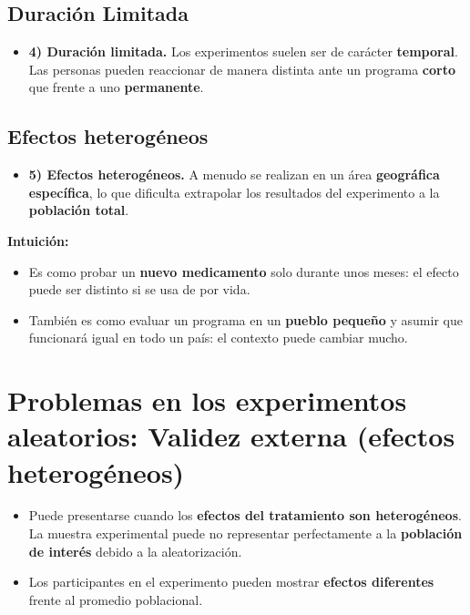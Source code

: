 \documentclass[12pt]{article}
\begin{document}
\subsection*{\noindent\textbf{Duración Limitada}}

\begin{itemize}
    \item \textbf{4) Duración limitada.}  
    Los experimentos suelen ser de carácter \textbf{temporal}. Las personas pueden reaccionar de manera distinta ante un programa \textbf{corto} que frente a uno \textbf{permanente}.
    \end{itemize}

\subsection*{\noindent\textbf{Efectos heterogéneos}}

    \begin{itemize}
    \item \textbf{5) Efectos heterogéneos.}  
    A menudo se realizan en un área \textbf{geográfica específica}, lo que dificulta extrapolar los resultados del experimento a la \textbf{población total}.
\end{itemize}

\textbf{Intuición:}
\begin{itemize}
    \item Es como probar un \textbf{nuevo medicamento} solo durante unos meses: el efecto puede ser distinto si se usa de por vida.
    \item También es como evaluar un programa en un \textbf{pueblo pequeño} y asumir que funcionará igual en todo un país: el contexto puede cambiar mucho.
\end{itemize}

\section*{\noindent\textbf{Problemas en los experimentos aleatorios: Validez externa (efectos heterogéneos)}}

\begin{itemize}
    \item Puede presentarse cuando los \textbf{efectos del tratamiento son heterogéneos}.  
    La muestra experimental puede no representar perfectamente a la \textbf{población de interés} debido a la aleatorización. 
    \item Los participantes en el experimento pueden mostrar \textbf{efectos diferentes} frente al promedio poblacional.
\end{itemize}
\end{document}
